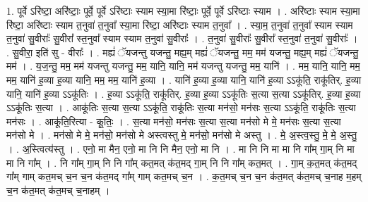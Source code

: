 \documentclass[17pt]{extarticle}
\begin{document}
1. पूर्वे ऽरि॑ष्टा॒ अरि॑ष्टाः॒ पूर्वे॒ पूर्वे ऽरि॑ष्टाः स्याम स्या॒मा रि॑ष्टाः॒ पूर्वे॒ पूर्वे ऽरि॑ष्टाः स्याम । . अरि॑ष्टाः स्याम स्या॒मा रि॑ष्टा॒ अरि॑ष्टाः स्याम त॒नुवा॑ त॒नुवा᳚ स्या॒मा रि॑ष्टा॒ अरि॑ष्टाः स्याम त॒नुवा᳚ । . स्या॒म॒ त॒नुवा॑ त॒नुवा᳚ स्याम स्याम त॒नुवा॑ सु॒वीराः᳚ सु॒वीरा᳚ स्त॒नुवा᳚ स्याम स्याम त॒नुवा॑ सु॒वीराः᳚ । . त॒नुवा॑ सु॒वीराः᳚ सु॒वीरा᳚ स्त॒नुवा॑ त॒नुवा॑ सु॒वीराः᳚ । . सु॒वीरा॒ इति॑ सु - वीराः᳚ । . मह्यं॑ ॅयजन्तु यजन्तु॒ मह्य॒म् मह्यं॑ ॅयजन्तु॒ मम॒ मम॑ यजन्तु॒ मह्य॒म् मह्यं॑ ॅयजन्तु॒ मम॑ । . य॒ज॒न्तु॒ मम॒ मम॑ यजन्तु यजन्तु॒ मम॒ यानि॒ यानि॒ मम॑ यजन्तु यजन्तु॒ मम॒ यानि॑ । . मम॒ यानि॒ यानि॒ मम॒ मम॒ यानि॑ ह॒व्या ह॒व्या यानि॒ मम॒ मम॒ यानि॑ ह॒व्या । . यानि॑ ह॒व्या ह॒व्या यानि॒ यानि॑ ह॒व्या ऽऽकू॑ति॒ राकू॑तिर्. ह॒व्या यानि॒ यानि॑ ह॒व्या ऽऽकू॑तिः । . ह॒व्या ऽऽकू॑ति॒ राकू॑तिर्. ह॒व्या ह॒व्या ऽऽकू॑तिः स॒त्या स॒त्या ऽऽकू॑तिर्. ह॒व्या ह॒व्या ऽऽकू॑तिः स॒त्या । . आकू॑तिः स॒त्या स॒त्या ऽऽकू॑ति॒ राकू॑तिः स॒त्या मन॑सो॒ मन॑सः स॒त्या ऽऽकू॑ति॒ राकू॑तिः स॒त्या मन॑सः । . आकू॑ति॒रित्या - कू॒तिः॒ । . स॒त्या मन॑सो॒ मन॑सः स॒त्या स॒त्या मन॑सो मे मे॒ मन॑सः स॒त्या स॒त्या मन॑सो मे । . मन॑सो मे मे॒ मन॑सो॒ मन॑सो मे अस्त्वस्तु मे॒ मन॑सो॒ मन॑सो मे अस्तु । . मे॒ अ॒स्त्व॒स्तु॒ मे॒ मे॒ अ॒स्तु॒ । . अ॒स्त्वित्य॑स्तु । . एनो॒ मा मैन॒ एनो॒ मा नि नि मैन॒ एनो॒ मा नि । . मा नि नि मा मा नि गा᳚म् गा॒म् नि मा मा नि गा᳚म् । . नि गा᳚म् गा॒म् नि नि गा᳚म् कत॒मत् क॑त॒मद् गा॒म् नि नि गा᳚म् कत॒मत् । . गा॒म् क॒त॒मत् क॑त॒मद् गा᳚म् गाम् कत॒मच् च॒न च॒न क॑त॒मद् गा᳚म् गाम् कत॒मच् च॒न । . क॒त॒मच् च॒न च॒न क॑त॒मत् क॑त॒मच् च॒नाह म॒हम् च॒न क॑त॒मत् क॑त॒मच् च॒नाहम् । \newline
\end{document}
